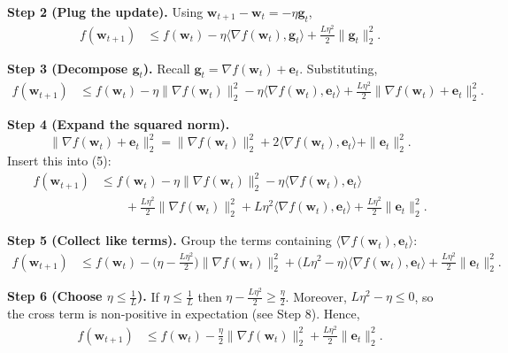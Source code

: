\documentclass{article}
\begin{document}
\noindent\textbf{Step 2 (Plug the update).}  
Using $\mathbf{w}_{t+1}-\mathbf{w}_t=-\eta\mathbf{g}_t$,
\begin{align}
f(\mathbf{w}_{t+1})
&\le f(\mathbf{w}_t)-\eta\langle\nabla f(\mathbf{w}_t),\mathbf{g}_t\rangle
      +\frac{L\eta^{2}}{2}\|\mathbf{g}_t\|_2^{2}. \tag{4}
\end{align}

\noindent\textbf{Step 3 (Decompose $\mathbf{g}_t$).}  
Recall $\mathbf{g}_t=\nabla f(\mathbf{w}_t)+\mathbf{e}_t$. Substituting,
\begin{align}
f(\mathbf{w}_{t+1})
&\le f(\mathbf{w}_t)-\eta\|\nabla f(\mathbf{w}_t)\|_2^{2}
      -\eta\langle\nabla f(\mathbf{w}_t),\mathbf{e}_t\rangle
      +\frac{L\eta^{2}}{2}\big\|\nabla f(\mathbf{w}_t)+\mathbf{e}_t\big\|_2^{2}. \tag{5}
\end{align}

\noindent\textbf{Step 4 (Expand the squared norm).}  
\[
\big\|\nabla f(\mathbf{w}_t)+\mathbf{e}_t\big\|_2^{2}
= \|\nabla f(\mathbf{w}_t)\|_2^{2}
  +2\langle\nabla f(\mathbf{w}_t),\mathbf{e}_t\rangle
  +\|\mathbf{e}_t\|_2^{2}.
\]
Insert this into (5):
\begin{align}
f(\mathbf{w}_{t+1})
&\le f(\mathbf{w}_t)-\eta\|\nabla f(\mathbf{w}_t)\|_2^{2}
      -\eta\langle\nabla f(\mathbf{w}_t),\mathbf{e}_t\rangle \nonumber\\
&\qquad+\frac{L\eta^{2}}{2}\|\nabla f(\mathbf{w}_t)\|_2^{2}
      +L\eta^{2}\langle\nabla f(\mathbf{w}_t),\mathbf{e}_t\rangle
      +\frac{L\eta^{2}}{2}\|\mathbf{e}_t\|_2^{2}. \tag{6}
\end{align}

\noindent\textbf{Step 5 (Collect like terms).}  
Group the terms containing $\langle\nabla f(\mathbf{w}_t),\mathbf{e}_t\rangle$:
\begin{align}
f(\mathbf{w}_{t+1})
&\le f(\mathbf{w}_t)
   -\Big(\eta-\frac{L\eta^{2}}{2}\Big)\|\nabla f(\mathbf{w}_t)\|_2^{2}
   +\big(L\eta^{2}-\eta\big)\langle\nabla f(\mathbf{w}_t),\mathbf{e}_t\rangle
   +\frac{L\eta^{2}}{2}\|\mathbf{e}_t\|_2^{2}. \tag{7}
\end{align}

\noindent\textbf{Step 6 (Choose $\eta\le\frac{1}{L}$).}  
If $\eta\le\frac{1}{L}$ then $\eta-\frac{L\eta^{2}}{2}\ge\frac{\eta}{2}$. Moreover,
$L\eta^{2}-\eta\le0$, so the cross term is non‑positive in expectation (see Step 8). Hence,
\begin{align}
f(\mathbf{w}_{t+1})
&\le f(\mathbf{w}_t)
   -\frac{\eta}{2}\|\nabla f(\mathbf{w}_t)\|_2^{2}
   +\frac{L\eta^{2}}{2}\|\mathbf{e}_t\|_2^{2}. \tag{8}
\end{align}
\end{document}
